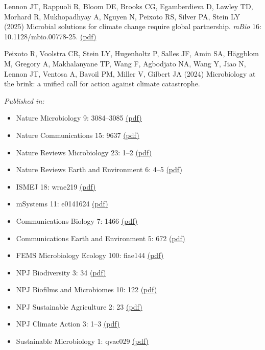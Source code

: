 \documentclass[11pt]{article}
\begin{document}
\begin{etaremune}
\item Lennon JT, Rappuoli R, Bloom DE, Brooks CG, Egamberdieva D, Lawley TD, Morhard R, Mukhopadhyay A, Nguyen N, Peixoto RS, Silver PA, Stein LY (2025) Microbial solutions for climate change require global partnership. \textit{mBio} 16: 10.1128/mbio.00778-25. \href{https://lennonlab.github.io/assets/publications/Lennon_etal_2025a.pdf}{(pdf)}

\item Peixoto R, Voolstra CR, Stein LY, Hugenholtz P, Salles JF, Amin SA, Häggblom M, Gregory A, Makhalanyane TP, Wang F, Agbodjato NA, Wang Y, Jiao N, Lennon JT, Ventosa A, Bavoil PM, Miller V, Gilbert JA (2024) Microbiology at the brink: a unified call for action against climate catastrophe. 

\textit{Published in:}
\begin{itemize}
  \item Nature Microbiology 9: 3084–3085 \href{https://lennonlab.github.io/assets/publications/Peixoto_etal_2024a.pdf}{(pdf)}
  \item Nature Communications 15: 9637 \href{https://lennonlab.github.io/assets/publications/Peixoto_etal_2024b.pdf}{(pdf)}
  \item Nature Reviews Microbiology 23: 1–2 \href{https://lennonlab.github.io/assets/publications/Peixoto_etal_2024c.pdf}{(pdf)}
  \item Nature Reviews Earth and Environment 6: 4–5 \href{https://lennonlab.github.io/assets/publications/Peixoto_etal_2024d.pdf}{(pdf)}
  \item ISMEJ 18: wrae219 \href{https://lennonlab.github.io/assets/publications/Peixoto_etal_2024e.pdf}{(pdf)}
  \item mSystems 11: e0141624 \href{https://lennonlab.github.io/assets/publications/Peixoto_etal_2024f.pdf}{(pdf)}
  \item Communications Biology 7: 1466 \href{https://lennonlab.github.io/assets/publications/Peixoto_etal_2024g.pdf}{(pdf)}
  \item Communications Earth and Environment 5: 672 \href{https://lennonlab.github.io/assets/publications/Peixoto_etal_2024h.pdf}{(pdf)}
  \item FEMS Microbiology Ecology 100: fiae144 \href{https://lennonlab.github.io/assets/publications/Peixoto_etal_2024i.pdf}{(pdf)}
  \item NPJ Biodiversity 3: 34 \href{https://lennonlab.github.io/assets/publications/Peixoto_etal_2024j.pdf}{(pdf)}
  \item NPJ Biofilms and Microbiomes 10: 122 \href{https://lennonlab.github.io/assets/publications/Peixoto_etal_2024k.pdf}{(pdf)}
  \item NPJ Sustainable Agriculture 2: 23 \href{https://lennonlab.github.io/assets/publications/Peixoto_etal_2024l.pdf}{(pdf)}
  \item NPJ Climate Action 3: 1–3 \href{https://lennonlab.github.io/assets/publications/Peixoto_etal_2024m.pdf}{(pdf)}
  \item Sustainable Microbiology 1: qvae029 \href{https://lennonlab.github.io/assets/publications/Peixoto_etal_2024n.pdf}{(pdf)}
\end{itemize}


\end{etaremune}
\end{document}
